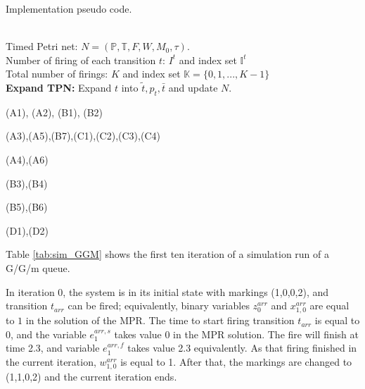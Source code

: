 \documentclass[suppldata]{interact}
\theoremstyle{plain}
\theoremstyle{definition}
\theoremstyle{remark}
\begin{document}
\begin{algorithm}
	\caption{Implementation pseudo code.}
	\begin{algorithmic}[1]
		\label{Algo:Implementation}
		\REQUIRE ~~ \\
		Timed Petri net: $N=(\mathbb{P}, \mathbb{T}, F, W, M_0, \tau)$. \\
		Number of firing of each transition $t$: ${I}^t$ and index set $\mathbb{I}^t$\\
		Total number of firings: $K$ and index set $\mathbb{K}=\{0,1,...,K-1\}$\\
		
		\STATE \textbf{Expand TPN:}
				\STATE Expand $t$ into $\tilde{t}, p_t, \bar{t}$ and update $N$.
			\ENDIF
		\ENDFOR
		
		\STATE (A1), (A2), (B1), (B2)
		\ENDFOR
		
		\STATE (A3),(A5),(B7),(C1),(C2),(C3),(C4)
		\ENDFOR
		
		\STATE (A4),(A6)
		\ENDFOR
		
		\STATE (B3),(B4)
		\ENDFOR
		
		\STATE (B5),(B6)
		\ENDFOR
		
		\STATE (D1),(D2)
		\ENDFOR
	\end{algorithmic}
\end{algorithm}



\noindent
Table \ref{tab:sim_GGM} shows the first ten iteration of a simulation run of a G/G/m queue.

In iteration 0, the system is in its initial state with markings (1,0,0,2), and transition $t_{arr}$ can be fired; equivalently, binary variables $z^{arr}_0$ and $x^{arr}_{1,0}$ are equal to $1$ in the solution of the MPR. The time to start firing transition $t_{arr}$ is equal to $0$, and the variable $e^{arr,s}_{1}$ takes value $0$ in the MPR solution. The fire will finish at time 2.3, and variable $e^{arr,f}_{1}$ takes value 2.3 equivalently. %
As that firing finished in the current iteration, $w^{arr}_{1,0}$ is equal to 1. After that, the markings are changed to (1,1,0,2) and the current iteration ends. 
\end{document}
